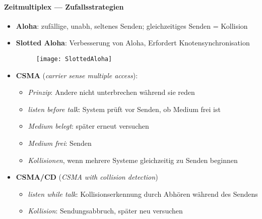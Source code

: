 \paragraph{Zeitmultiplex --- Zufallsstrategien}
\begin{itemize}
  \item \textbf{Aloha}: zufällige, unabh, seltenes Senden; gleichzeitiges Senden = Kollision
  \item \textbf{Slotted Aloha}: Verbesserung von Aloha, Erfordert Knotensynchronisation
    \begin{figure}[H]\centering\label{SlottedAloha}\texttt{[image: SlottedAloha]}\end{figure}
  \item \textbf{CSMA} (\emph{carrier sense multiple access}):
  \begin{itemize}
    \item \emph{Prinzip}: Andere nicht unterbrechen während sie reden
    \item \emph{listen before talk}: System prüft vor Senden, ob Medium frei ist
    \item \emph{Medium belegt}: später erneut versuchen
    \item \emph{Medium frei}: Senden
    \item \emph{Kollisionen}, wenn mehrere Systeme gleichzeitig zu Senden beginnen
  \end{itemize}
  \item \textbf{CSMA/CD} (\emph{CSMA with collision detection})
  \begin{itemize}
    \item \emph{listen while talk}: Kollisionserkennung durch Abhören während des Sendens
    \item \emph{Kollision}: Sendungsabbruch, später neu versuchen
  \end{itemize}
\end{itemize}

